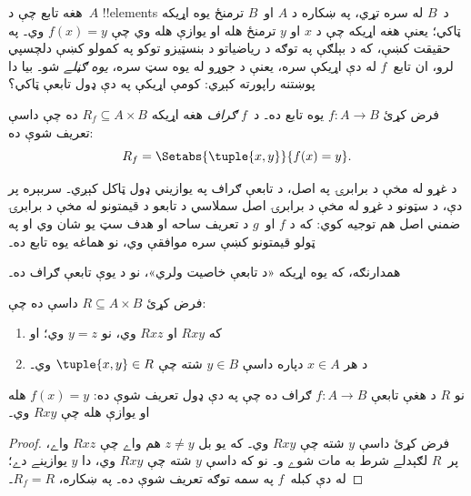 \documentclass[../../../include/open-logic-section]{subfiles}
\begin{document}


\begin{explain}
هغه تابع چې د~$A$ !!{element}s د~$B$ له  سره
تړي، په ښکاره د $A$ او~$B$ ترمنځ يوه اړيکه ټاکي؛ يعنې هغه اړيکه
چې د $x$ او $y$ ترمنځ هله او يوازې هله وي چې $f(x) = y$ وي۔
په حقيقت کښې، که د بېلګې په توګه د رياضياتو د بنسټيزو توکو
په کمولو کښې دلچسپي لرو، ان تابع~$f$ له دې اړيکې سره، يعنې
د جوړو له يوه سټ سره، \emph{يوه ګڼلے} شو۔ بيا دا پوښتنه راپورته
کېږي: کومې اړيکې په دې ډول تابعې ټاکي؟
\end{explain}

\begin{defn}فرض کړئ $f\colon A \to B$ يوه تابع ده۔
د~$f$ \emph{ګراف} هغه اړيکه $R_f \subseteq A \times B$ ده چې داسې
تعريف شوې ده:
\[
R_f = \Setabs{\tuple{x,y}}{f(x) = y}.
\]
\end{defn}

\begin{explain}
د غړو له مخې د برابرۍ په اصل، د تابعې ګراف په يوازيني ډول ټاکل
کېږي۔ سربېره پر دې، د سټونو د غړو له مخې د برابرۍ اصل سملاسي
د تابعو د قيمتونو له مخې د برابرۍ ضمني اصل هم توجيه کوي: که د
$f$ او~$g$ د تعريف ساحه او هدف سټ يو شان وي او په ټولو قيمتونو
کښې سره موافقې وي، نو هماغه يوه تابع ده۔

همدارنګه، که يوه اړيکه «د تابعې خاصيت ولري»، نو د يوې تابعې ګراف ده۔
\end{explain}

\begin{prop}
فرض کړئ $R \subseteq A \times B$ داسې ده چې:
\begin{enumerate}
\item که $Rxy$ او $Rxz$ وي، نو $y = z$ وي؛ او
\item د هر $x \in A$ دپاره داسې $y \in B$ شته چې $\tuple{x,
y} \in R$ وي۔
\end{enumerate}
نو $R$ د هغې تابعې $f\colon A \to B$ ګراف ده چې په دې ډول
تعريف شوې ده: $f(x) = y$ هله او يوازې هله چې $Rxy$ وي۔
\end{prop}

\begin{proof}
فرض کړئ داسې $y$ شته چې $Rxy$ وي۔ که يو بل $z \neq y$ هم واے
چې $Rxz$ واے، پر~$R$ لګېدلے شرط به مات شوے و۔ نو که داسې $y$
شته چې $Rxy$ وي، دا $y$ يوازينے دے؛ له دې کبله~$f$ په سمه توګه
تعريف شوې ده۔ په ښکاره، $R_f = R$۔
\end{proof}
\end{document}
